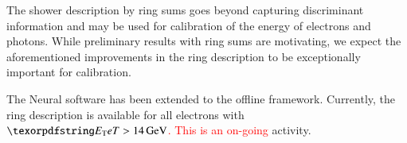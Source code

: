 The shower description by ring sums goes beyond capturing discriminant
information and may be used for calibration of the energy of electrons and
photons. While preliminary results with ring sums are motivating, we expect the aforementioned
improvements in the ring description to be exceptionally important for
calibration.

The Neural\rnn{} software has been extended to the offline framework. Currently,
the ring description is available for all electrons with \textcolor{red}{$\et>\SI{14}{\GeV}$.
This is an on-going} activity.


